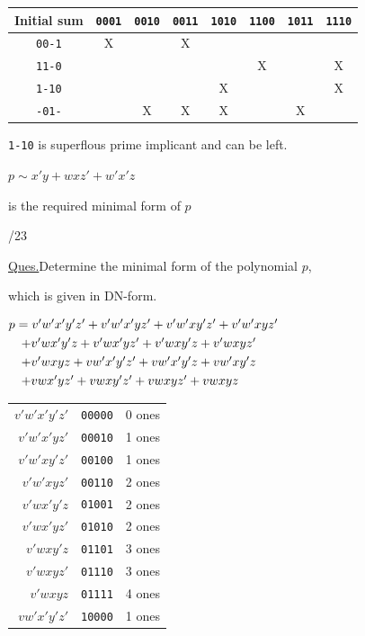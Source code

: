 \documentclass[12pt,a4paper]{article}
\newcommand{\bn}[1]{\texttt{#1}}
\newcommand{\ones}[1]{\hspace{1.5cm}\small #1 ones}
\begin{document}
\renewcommand{\arraystretch}{2.2}
\begin{tabular}{|c|c|c|c|c|c|c|c|}
\hline
\small Initial sum & \bn{0001} & \bn{0010} & \bn{0011} & \bn{1010} & \bn{1100} & \bn{1011} & \bn{1110} \\ \hline
\bn{00-1} & X &   & X &   &   &   &   \\ \hline
\bn{11-0} &   &   &   &   & X &   & X \\ \hline
\bn{1-10} &   &   &   & X &   &   & X \\ \hline
\bn{-01-} &   & X & X & X &   & X &   \\ \hline
\end{tabular}

\bigskip
\renewcommand{\arraystretch}{1}
\hspace{1cm}\bn{1-10} is superflous prime implicant and can be left.

\medskip
\hspace{1cm}$p \sim x'y + wxz' + w'x'z$

\hspace{1cm}is the required minimal form of $p$

\bigskip{}/23

\underline{Ques.}\hspace{1cm}Determine the minimal form of the polynomial $p$,

\hspace{2.7cm}which is given in DN-form.

\bigskip
\hspace{1cm}$\begin{array}{@{}l@{}}
p = v'w'x'y'z' + v'w'x'yz' + v'w'xy'z' + v'w'xyz' \\[3pt]
\quad + v'wx'y'z + v'wx'yz' + v'wxy'z + v'wxyz' \\[3pt]
\quad + v'wxyz + vw'x'y'z' + vw'x'y'z + vw'xy'z \\[3pt]
\quad + vwx'yz' + vwxy'z' + vwxyz' + vwxyz
\end{array}$

\bigskip
\renewcommand{\arraystretch}{1.6}
\hspace{1cm}\begin{tabular}{r@{\ =\ \ }l l}
$v'w'x'y'z'$ & \bn{00000} & \ones{0} \\
$v'w'x'yz'$  & \bn{00010} & \ones{1} \\
$v'w'xy'z'$  & \bn{00100} & \ones{1} \\
$v'w'xyz'$   & \bn{00110} & \ones{2} \\
$v'wx'y'z$   & \bn{01001} & \ones{2} \\
$v'wx'yz'$   & \bn{01010} & \ones{2} \\
$v'wxy'z$    & \bn{01101} & \ones{3} \\
$v'wxyz'$    & \bn{01110} & \ones{3} \\
$v'wxyz$     & \bn{01111} & \ones{4} \\
$vw'x'y'z'$  & \bn{10000} & \ones{1} \\
\end{tabular}
\end{document}
